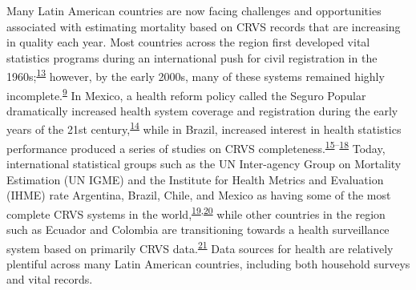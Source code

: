 \documentclass[
]{article}
\begin{document}
Many Latin American countries are now facing challenges and opportunities associated with estimating mortality based on CRVS records that are increasing in quality each year. Most countries across the region first developed vital statistics programs during an international push for civil registration in the 1960s;\textsuperscript{\protect\hyperlink{ref-Rao2019}{13}} however, by the early 2000s, many of these systems remained highly incomplete.\textsuperscript{\protect\hyperlink{ref-Mikkelsen2015}{9}} In Mexico, a health reform policy called the Seguro Popular dramatically increased health system coverage and registration during the early years of the 21st century,\textsuperscript{\protect\hyperlink{ref-Frenk2006}{14}} while in Brazil, increased interest in health statistics performance produced a series of studies on CRVS completeness.\textsuperscript{\protect\hyperlink{ref-Schmid2011}{15}--\protect\hyperlink{ref-Lima2018}{18}} Today, international statistical groups such as the UN Inter-agency Group on Mortality Estimation (UN IGME) and the Institute for Health Metrics and Evaluation (IHME) rate Argentina, Brazil, Chile, and Mexico as having some of the most complete CRVS systems in the world,\textsuperscript{\protect\hyperlink{ref-UNInter-agencyGrouponMortalityEstimationUNIGME2020}{19},\protect\hyperlink{ref-Dicker2018}{20}} while other countries in the region such as Ecuador and Colombia are transitioning towards a health surveillance system based on primarily CRVS data.\textsuperscript{\protect\hyperlink{ref-Ribotta2019}{21}} Data sources for health are relatively plentiful across many Latin American countries, including both household surveys and vital records.
\end{document}
